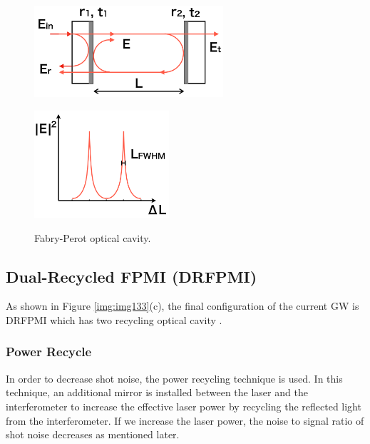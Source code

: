 \begin{figure}[h]
  \begin{minipage}[b]{0.5\hsize}
    \begin{center}   
      \includegraphics[width=7cm]{./img_chap1/img133a.png}
       \label{img:img133a}
    \end{center}
  \end{minipage}\hspace{3pt}
  \begin{minipage}[b]{0.5\hsize}
    \begin{center}   
      \includegraphics[width=5cm]{./img_chap1/img133b.png}
       \label{img:img133b}
    \end{center}    
  \end{minipage}
  \caption{Fabry-Perot optical cavity.}
\end{figure}


\subsection{Dual-Recycled FPMI (DRFPMI)}
As shown in Figure \ref{img:img133}(c), the final configuration of the current GW is DRFPMI which has two recycling optical cavity \cite{meers1988recycling}.

\subsubsection{Power Recycle}
In order to decrease shot noise, the power recycling technique is used. In this technique, an additional mirror is installed between the laser and the interferometer to increase the effective laser power by recycling the reflected light from the interferometer. If we increase the laser power, the noise to signal ratio of shot noise decreases as mentioned later.


